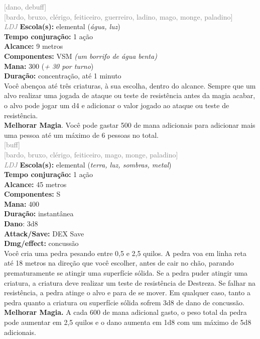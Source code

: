 \documentclass{RPG_Adventure}[2021/10/20]
\begin{document}
{\scriptsize \textcolor{gray}{[dano, debuff]\\}}
{\scriptsize \textcolor{gray}{[bardo, bruxo, clérigo, feiticeiro, guerreiro, ladino, mago, monge, paladino]\\}}
{\tiny \textcolor{gray}{\textit{LDJ}}}
{\small \t \textbf{Escola(s):} elemental (\textit{água, luz})\\\t \textbf{Tempo conjuração:} 1 ação\\\t \textbf{Alcance:} 9 metros\\\t \textbf{Componentes:} VSM \textit{(um borrifo de água benta)}\\\t \textbf{Mana:} 300 (\textit{+ 30 por turno})\\\t \textbf{Duração:} concentração, até 1 minuto\\}
{\normalsize Você abençoa até três criaturas, à sua escolha, dentro do alcance. Sempre que um alvo realizar uma jogada de ataque ou teste de resistência antes da magia acabar, o alvo pode jogar um d4 e adicionar o valor jogado ao ataque ou teste de resistência.\\\t \textbf{Melhorar Magia}. Você pode gastar 500 de mana adicionais para adicionar mais uma pessoa até um máximo de 6 pessoas no total.\\}
{\scriptsize \textcolor{gray}{[buff]\\}}
{\scriptsize \textcolor{gray}{[bardo, bruxo, clérigo, feiticeiro, mago, monge, paladino]\\}}
{\tiny \textcolor{gray}{\textit{LDJ}}}
{\small \t \textbf{Escola(s):} elemental (\textit{terra, luz, sombras, metal})\\\t \textbf{Tempo conjuração:} 1 ação\\\t \textbf{Alcance:} 45 metros\\\t \textbf{Componentes:} S\\\t \textbf{Mana:} 400\\\t \textbf{Duração:} instantânea\\\t \textbf{Dano}: 3d8\\\t \textbf{Attack/Save:} DEX Save\\\t \textbf{Dmg/effect:} concussão\\}
{\normalsize Você cria uma pedra pesando entre 0,5 e 2,5 quilos. A pedra voa em linha reta até 18 metros na direção que você escolher, antes de cair no chão, parando prematuramente se atingir uma superfície sólida. Se a pedra puder atingir uma criatura, a criatura deve realizar um teste de resistência de Destreza. Se falhar na resistência, a pedra atinge o alvo e para de se mover. Em qualquer caso, tanto a pedra quanto a criatura ou superfície sólida sofrem 3d8 de dano de concussão.\\\t \textbf{Melhorar Magia.} A cada 600 de mana adicional gasto, o peso total da pedra pode aumentar em 2,5 quilos e o dano aumenta em 1d8 com um máximo de 5d8 adicionais.\\}
\end{document}
